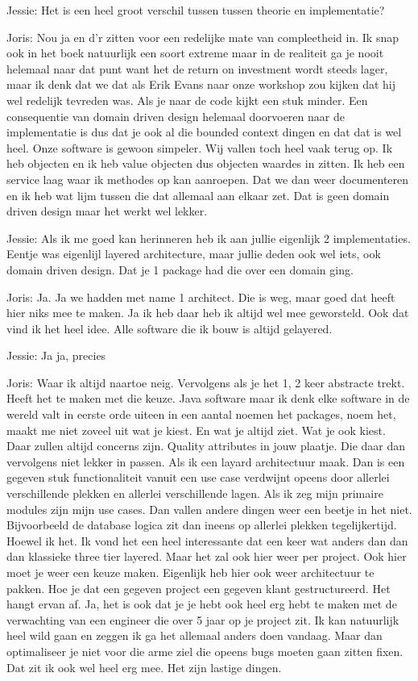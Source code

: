 Jessie: Het is een heel groot verschil tussen tussen theorie en implementatie?

Joris: Nou ja en d'r zitten voor een redelijke mate van compleetheid in. Ik snap ook in het boek natuurlijk een soort extreme maar in de realiteit ga je nooit helemaal naar dat punt want het de return on investment wordt steeds lager, maar ik denk dat we dat als Erik Evans naar onze workshop zou kijken dat hij wel redelijk tevreden was. Als je naar de code kijkt een stuk minder. Een consequentie van domain driven design helemaal doorvoeren naar de implementatie is dus dat je ook al die bounded context dingen en dat dat is wel heel. Onze software is gewoon simpeler. Wij vallen toch heel vaak terug op. Ik heb objecten en ik heb value objecten dus objecten waardes in zitten. Ik heb een service laag waar ik methodes op kan aanroepen. Dat we dan weer documenteren en ik heb wat lijm tussen die dat allemaal aan elkaar zet. Dat is geen domain driven design maar het werkt wel lekker.

Jessie: Als ik me goed kan herinneren heb ik aan jullie eigenlijk 2 implementaties. Eentje was eigenlijl layered architecture, maar jullie deden ook wel iets, ook domain driven design. Dat je 1 package had die over een domain ging.

Joris: Ja. Ja we hadden met name 1 architect. Die is weg, maar goed dat heeft hier niks mee te maken. Ja ik heb daar heb ik altijd wel mee geworsteld. Ook dat vind ik het heel idee. Alle software die ik bouw is altijd gelayered.

Jessie: Ja ja, precies

Joris: Waar ik altijd naartoe neig. Vervolgens als je het 1, 2 keer abstracte trekt. Heeft het te maken met die keuze. Java software maar ik denk elke software in de wereld valt in eerste orde uiteen in een aantal noemen het packages, noem het, maakt me niet zoveel uit wat je kiest. En wat je altijd ziet. Wat je ook kiest. Daar zullen altijd concerns zijn. Quality attributes in jouw plaatje. Die daar dan vervolgens niet lekker in passen. Als ik een layard architectuur maak. Dan is een gegeven stuk functionaliteit vanuit een use case verdwijnt opeens door allerlei verschillende plekken en allerlei verschillende lagen. Als ik zeg mijn primaire modules zijn mijn use cases. Dan vallen andere dingen weer een beetje in het niet. Bijvoorbeeld de database logica zit dan ineens op allerlei plekken tegelijkertijd. Hoewel ik het. Ik vond het een heel interessante dat een keer wat anders dan dan dan klassieke three tier layered. Maar het zal ook hier weer per project. Ook hier moet je weer een keuze maken. Eigenlijk heb hier ook weer architectuur te pakken. Hoe je dat een gegeven project een gegeven klant gestructureerd. Het hangt ervan af. Ja, het is ook dat je je hebt ook heel erg hebt te maken met de verwachting van een engineer die over 5 jaar op je project zit. Ik kan natuurlijk heel wild gaan en zeggen ik ga het allemaal anders doen vandaag. Maar dan optimaliseer je niet voor die arme ziel die opeens bugs moeten gaan zitten fixen. Dat zit ik ook wel heel erg mee. Het zijn lastige dingen.

